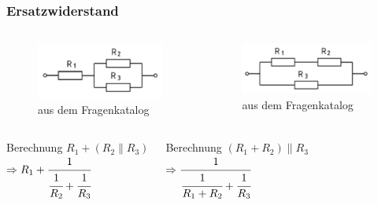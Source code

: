 \begin{frame}
  \frametitle{Ersatzwiderstand}
  \begin{columns}
    \begin{figure}
      \includegraphics[width=.75\textwidth,height=.3\textheight,keepaspectratio]{e04/Ersatzwiderstand1.png}
      \caption{aus dem Fragenkatalog}
    \end{figure}
    \begin{figure}
      \includegraphics[width=.75\textwidth,height=.3\textheight,keepaspectratio]{e04/Ersatzwiderstand2.png}
      \caption{aus dem Fragenkatalog}
    \end{figure}
  \end{columns}
  \begin{columns}
    \pause
    \begin{exampleblock}{Berechnung}
      $R_1 + (R_2 \parallel R_3)$ \\[1.5em]
      $\Rightarrow R_1 + \cfrac{1}{\cfrac{1}{R_2} + \cfrac{1}{R_3}}$
    \end{exampleblock}
    \pause
    \begin{exampleblock}{Berechnung}
      $(R_1 + R_2) \parallel R_3$\\[1.5em]
      $\Rightarrow \cfrac{1}{\cfrac{1}{R_1 + R_2} + \cfrac{1}{R_3}}$
    \end{exampleblock}
  \end{columns}
\end{frame}

